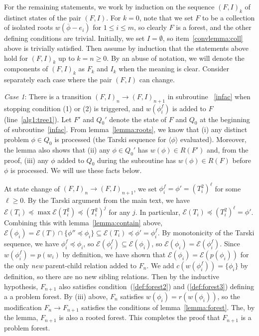 \documentclass[11pt,reqno]{amsart}
\theoremstyle{definition}
\numberwithin{equation}{section}
\newcommand{\ol}{\overline}
\newcommand{\lag}{\langle}
\newcommand{\rag}{\rangle}
\newcommand{\pre}{\phi}
\newcommand{\sub}{\subseteq}
\newcommand{\fix}{\mathcal{E}}
\newcommand{\peq}{\preceq}
\newcommand{\toppre}{\ol{\pre}}
\newcommand{\acto}{Q_0}
\newcommand{\coll}{I}
\newcommand{\forest}{F}
\newcommand{\pair}{(F,I)}
\newcommand{\roott}{R}
\begin{document}
\begin{enumerate}
For the remaining statements, we work by induction on the sequence $\pair_k$ of distinct states of the pair $\pair$. 
For $k = 0$, note that we set $F$ to be a collection of isolated roots $w(\toppre - e_i)$ for $1 \leq i \leq m$, so clearly $F$ is a forest, and the other defining conditions are trivial. 
Initially, we set $\coll = \emptyset$, so item~\ref{convlemma:coll} above is trivially satisfied. 
Then assume by induction that the statements above hold for $\pair_k$ up to $k = n \geq 0$. 
By an abuse of notation, we will denote the components of $\pair_k$ as $\forest_k$ and $\coll_k$ when the meaning is clear.
Consider separately each case where the pair $\pair$ can change.

\emph{Case 1}: There is a transition $\pair_n \to \pair_{n +1}$ in subroutine ~\ref{infac} when stopping condition (1) or (2) is triggered, and $w(\pre_i^f)$ is added to $\forest$ (line~\ref{alg1:tree1}). 
Let $\forest'$ and $\acto'$ denote the state of $\forest$ and $\acto$ at the beginning of subroutine~\ref{infac}.
From lemma~\ref{lemma:roots}, we know that (i) any distinct problem $\pre \in \acto$ is processed (the Tarski sequence for $\lag \pre \rag$ evaluated).
Moreover, the lemma also shows that (ii) any $\pre \in \acto'$ has $w(\pre) \in \roott(\forest')$ and, from the proof, (iii) any $\pre$ added to $\acto$ during the subroutine has $w(\pre) \in \roott(\forest)$ before $\pre$ is processed. 
We will use these facts below. 

At state change of $\pair_n \to \pair_{n + 1}$, we set $\pre_i^f = \pre' = (T_i^2)^{\ell}$ for some $\ell \geq 0$.
By the Tarski argument from the main text, we have $\fix(T_i) \peq \max \fix(T_i^2) \peq (T_i^2)^{j}$ for any $j$. 
In particular, $\fix(T_i) \peq (T_i^2)^{\ell} = \pre'$.
Combining this with lemma~\ref{lemma:contain} above, $\fix(\pre_i) = \fix(T) \cap \{\pre'' \peq \pre_i\} \sub \fix(T_i) \peq \pre' = \pre_i^f$. 
By monotonicity of the Tarski sequence, we have $\pre_i^f \peq \pre_i$, so $\fix(\pre_i^f) \sub \fix(\pre_i)$, so $\fix(\pre_i) = \fix(\pre_i^f)$.
Since $w(\pre_i^f) = p(w_i)$ by definition, we have shown that $\fix(\pre_i) = \fix(p(\pre_i))$ for the only \emph{new} parent-child relation added to $\forest_n$. 
We add $c(w(\pre_i^f)) = \{\pre_i\}$ by definition, so there are no new sibling relations. 
Then by the inductive hypothesis, $\forest_{n+1}$ also satisfies condition~(\ref{def:forest2}) and (\ref{def:forest3}) defining a a problem forest.
By (iii) above, $\forest_n$ satisfies $w(\pre_i) = r(w(\pre_i))$, so the modification $\forest_n \to \forest_{n + 1}$ satisfies the conditions of lemma~\ref{lemma:forest}.
The, by the lemma, $\forest_{n + 1}$ is also a rooted forest. 
This completes the proof that $\forest_{n + 1}$ is a problem forest.


\end{enumerate}
\end{document}
